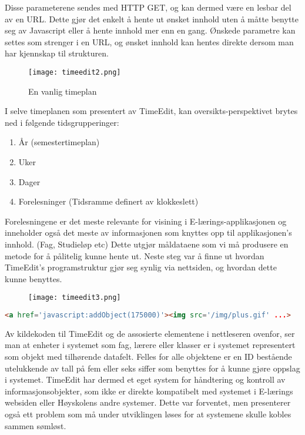 \documentclass[../main.tex]{subfiles}
\begin{document}
Disse parameterene sendes med HTTP GET, og kan dermed være en lesbar del av en URL. Dette gjør det enkelt å hente ut ønsket innhold uten å måtte benytte seg av Javascript eller å hente innhold mer enn en gang. Ønskede parametre kan settes som strenger i en URL, og ønsket innhold kan hentes direkte dersom man har kjennskap til strukturen.

\begin{figure}[H]
  \centering
  \texttt{[image: timeedit2.png]}
  \caption{En vanlig timeplan}
\end{figure}

I selve timeplanen som presentert av TimeEdit, kan oversikts-perspektivet brytes ned i følgende tidsgrupperinger:

\begin{enumerate}
\item År (semestertimeplan)
\item Uker
\item Dager
\item Forelesninger (Tidsramme definert av klokkeslett)
\end{enumerate}

Forelesningene er det meste relevante for visining i E-lærings-applikasjonen og inneholder også det meste av informasjonen som knyttes opp til applikasjonen’s innhold. (Fag, Studieløp etc)
Dette utgjør måldataene som vi må produsere en metode for å pålitelig kunne hente ut.\newline
\newline
Neste steg var å finne ut hvordan TimeEdit’s programstruktur gjør seg synlig via nettsiden, og hvordan dette kunne benyttes.

\begin{figure}[H]
  \centering
  \texttt{[image: timeedit3.png]}
\end{figure}

\begin{lstlisting}[language=HTML, frame=single, caption={BESKRIVLESDDS}]
<a href='javascript:addObject(175000)'><img src='/img/plus.gif' ...>
\end{lstlisting}

Av kildekoden til TimeEdit og de assosierte elementene i nettleseren ovenfor, ser man at enheter i systemet som fag, lærere eller klasser er i systemet representert som objekt med tilhørende datafelt. Felles for alle objektene er en ID bestående utelukkende av tall på fem eller seks siffer som benyttes for å kunne gjøre oppslag i systemet. TimeEdit har dermed et eget system for håndtering og kontroll av informasjonsobjekter, som ikke er direkte kompatibelt med systemet i E-lærings websiden eller Høyskolens andre systemer. Dette var forventet, men presenterer også ett problem som må under utviklingen løses for at systemene skulle kobles sammen sømløst. 
\end{document}
